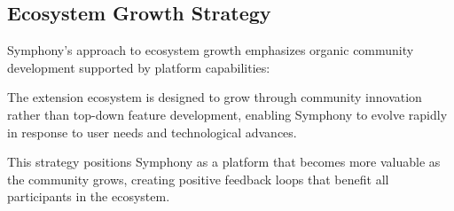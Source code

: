 \subsection*{Ecosystem Growth Strategy}

Symphony's approach to ecosystem growth emphasizes organic community development supported by platform capabilities:

\begin{successbox}
The extension ecosystem is designed to grow through community innovation rather than top-down feature development, enabling Symphony to evolve rapidly in response to user needs and technological advances.
\end{successbox}

This strategy positions Symphony as a platform that becomes more valuable as the community grows, creating positive feedback loops that benefit all participants in the ecosystem.
